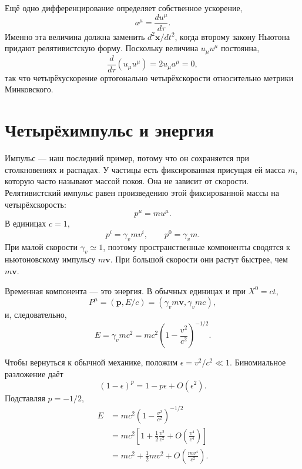 Ещё одно дифференцирование определяет собственное ускорение,
\begin{equation}
a^\mu=\frac{du^\mu}{d\tau}.
\end{equation}
Именно эта величина должна заменить \(d^2\mathbf x/dt^2\), когда второму закону Ньютона придают релятивистскую форму. Поскольку величина \(u_\mu u^\mu\) постоянна,
\begin{equation}
\frac{d}{d\tau}(u_\mu u^\mu)=2u_\mu a^\mu=0,
\end{equation}
так что четырёхускорение ортогонально четырёхскорости относительно метрики Минковского.

\section{Четырёхимпульс и энергия}

Импульс — наш последний пример, потому что он сохраняется при столкновениях и распадах. У частицы есть фиксированная присущая ей масса \(m\), которую часто называют массой покоя. Она не зависит от скорости. Релятивистский импульс равен произведению этой фиксированной массы на четырёхскорость:
\begin{equation}
p^\mu=mu^\mu.
\label{eq:l5-four-momentum}
\end{equation}
В единицах \(c=1\),
\begin{equation}
p^i=\gamma_v m v^i,
\qquad
p^0=\gamma_v m.
\end{equation}
При малой скорости \(\gamma_v\simeq1\), поэтому пространственные компоненты сводятся к ньютоновскому импульсу \(m\mathbf v\). При большой скорости они растут быстрее, чем \(m\mathbf v\).

Временная компонента — это энергия. В обычных единицах и при \(X^0=ct\),
\begin{equation}
P^\mu=(\mathbf p,E/c)
=(\gamma_v m\mathbf v,\gamma_v mc),
\end{equation}
и, следовательно,
\begin{equation}
E=\gamma_v mc^2
=mc^2\left(1-\frac{v^2}{c^2}\right)^{-1/2}.
\label{eq:l5-relativistic-energy}
\end{equation}

Чтобы вернуться к обычной механике, положим
\(\epsilon=v^2/c^2\ll1\). Биномиальное разложение даёт
\begin{equation}
(1-\epsilon)^p=1-p\epsilon+O(\epsilon^2).
\end{equation}
Подставляя \(p=-1/2\),
\begin{align}
E
&=mc^2\left(1-\frac{v^2}{c^2}\right)^{-1/2}\nonumber\\
&=mc^2\left[1+\frac12\frac{v^2}{c^2}
  +O\!\left(\frac{v^4}{c^4}\right)\right]\nonumber\\
&=mc^2+\frac12mv^2+O\!\left(\frac{mv^4}{c^2}\right).
\label{eq:l5-energy-expansion}
\end{align}

